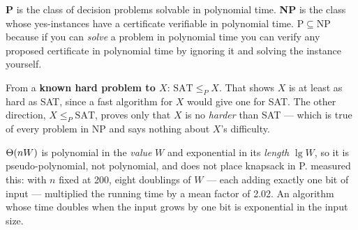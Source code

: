 \begin{ans}
  \item \textbf{P} is the class of decision problems solvable in polynomial
        time. \textbf{NP} is the class whose yes-instances have a certificate
        verifiable in polynomial time. $\mathrm{P} \subseteq \mathrm{NP}$
        because if you can \emph{solve} a problem in polynomial time you can
        verify any proposed certificate in polynomial time by ignoring it and
        solving the instance yourself.
  \item From a \textbf{known hard problem to $X$}: $\text{SAT} \le_{P} X$.
        That shows $X$ is at least as hard as SAT, since a fast algorithm for
        $X$ would give one for SAT. The other direction, $X \le_{P}
        \text{SAT}$, proves only that $X$ is no \emph{harder} than SAT --- which
        is true of every problem in NP and says nothing about $X$'s difficulty.
  \item $\Theta(nW)$ is polynomial in the \emph{value} $W$ and exponential in
        its \emph{length} $\lg W$, so it is pseudo-polynomial, not polynomial,
        and does not place knapsack in P.  measured this: with $n$
        fixed at 200, eight doublings of $W$ --- each adding exactly one bit of
        input --- multiplied the running time by a mean factor of 2.02. An
        algorithm whose time doubles when the input grows by one bit is
        exponential in the input size.
\end{ans}

